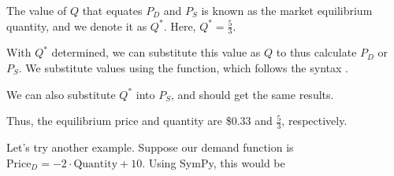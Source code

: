 \documentclass[letterpaper,10pt,english]{jupyterBook}
\begin{document}
\begin{sphinxVerbatim}[commandchars=\\\{\}]
   
\end{sphinxVerbatim}

\noindent{}

\sphinxAtStartPar
The value of \(Q\) that equates \(P_D\) and \(P_S\) is known as the market equilibrium quantity, and we denote it as \(Q^*\). Here, \(Q^* = \frac{5}{3}\).

\sphinxAtStartPar
With \(Q^*\) determined, we can substitute this value as \(Q\) to thus calculate \(P_D\) or \(P_S\). We substitute values using the  function, which follows the syntax .

\begin{sphinxVerbatim}[commandchars=\\\{\}]
 
\end{sphinxVerbatim}

\noindent{}

\sphinxAtStartPar
We can also substitute \(Q^*\) into \(P_S\), and should get the same results.

\begin{sphinxVerbatim}[commandchars=\\\{\}]
 
\end{sphinxVerbatim}

\noindent{}

\sphinxAtStartPar
Thus, the equilibrium price and quantity are \$0.33 and \(\frac{5}{3}\), respectively.

\sphinxAtStartPar
Let’s try another example. Suppose our demand function is \(\text{Price}_{D}=-2 \cdot \text{Quantity} + 10\). Using SymPy, this would be

\begin{sphinxVerbatim}[commandchars=\\\{\}]
      
\end{sphinxVerbatim}
\end{document}
